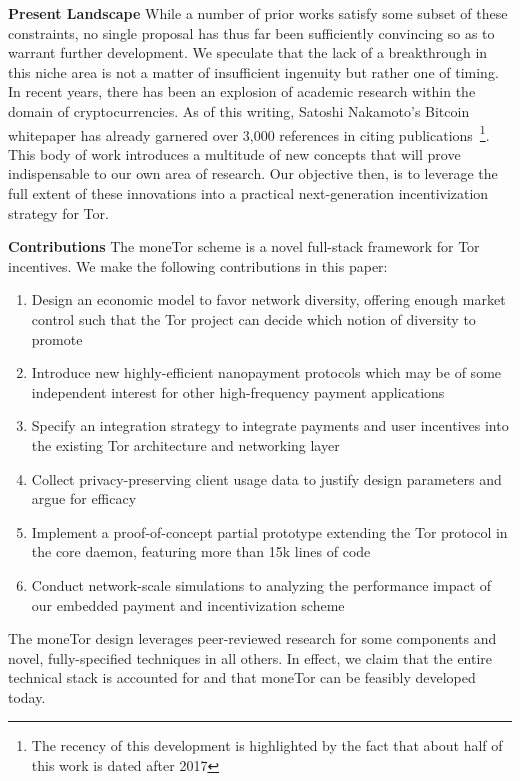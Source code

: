 \textbf{Present Landscape} While a number of prior works satisfy some subset of
these constraints, no single proposal has thus far been sufficiently convincing
so as to warrant further development. We speculate that the lack of a
breakthrough in this niche area is not a matter of insufficient ingenuity but
rather one of timing. In recent years, there has been an explosion of academic
research within the domain of cryptocurrencies. As of this writing, Satoshi
Nakamoto's Bitcoin whitepaper has already garnered over 3,000 references in
citing publications~\cite{nakamoto2008bitcoin}\footnote{The recency of this
  development is highlighted by the fact that about half of this work is dated
  after 2017}. This body of work introduces a multitude of new concepts that
will prove indispensable to our own area of research. Our objective then, is to
leverage the full extent of these innovations into a practical next-generation
incentivization strategy for Tor.

\label{sec:Contributions}
\textbf{Contributions} The moneTor scheme is a novel full-stack framework for
Tor incentives. We make the following contributions in this paper:

\begin{enumerate}
\item Design an economic model to favor network diversity, offering enough
  market control such that the Tor project can decide which notion of diversity
  to promote
\item Introduce new highly-efficient nanopayment protocols which may be of some
  independent interest for other high-frequency payment applications
\item Specify an integration strategy to integrate payments and user incentives
  into the existing Tor architecture and networking layer
\item Collect privacy-preserving client usage data to justify design parameters
  and argue for efficacy
\item Implement a proof-of-concept partial prototype extending the Tor protocol
  in the core daemon, featuring more than 15k lines of code
\item Conduct network-scale simulations to analyzing the performance impact of
  our embedded payment and incentivization scheme
\end{enumerate}

The moneTor design leverages peer-reviewed research for some components and
novel, fully-specified techniques in all others. In effect, we claim that the
entire technical stack is accounted for and that moneTor can be feasibly
developed today.
